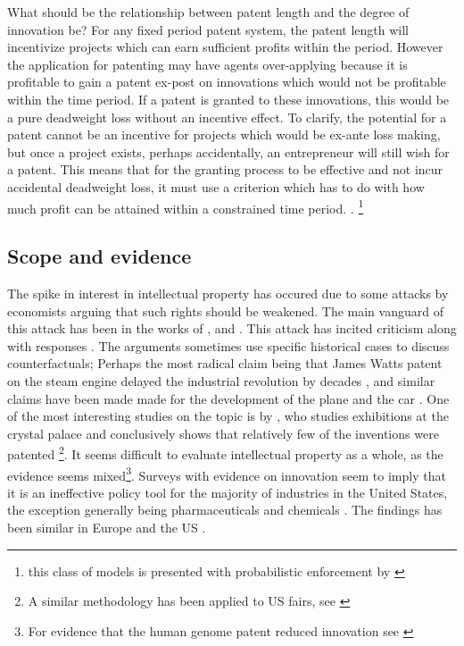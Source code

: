 \documentclass[12pt]{report}
\numberwithin{equation}{section}
\begin{document}
What should be the relationship between patent length and the degree of innovation be? For any fixed period patent system, the patent length will incentivize projects which can earn sufficient profits within the period. However the application for patenting may have agents over-applying because it is profitable to gain a patent ex-post on innovations which would not be profitable within the time period. If a patent is granted to these innovations, this would be a pure deadweight loss without an incentive effect. To clarify, the potential for a patent cannot be an incentive for projects which would be ex-ante loss making, but once a project exists, perhaps accidentally, an entrepreneur will still wish for a patent. This means that for the granting process to be effective and not incur accidental deadweight loss, it must use a criterion which has to do with how much profit can be attained within a constrained time period. \cite{ODonoghue1998}. \footnote{this class of models is presented with probabilistic enforcement by \cite{Chou2007} }

\subsection{Scope and evidence}

The spike in interest in intellectual property has occured due to some attacks by economists arguing that such rights should be weakened. The main vanguard of this attack has been in the works of \cite{dosi2006much}, \cite{boldrinlevine} and  \cite{bessen2008patent}. This attack has incited criticism \citep{scherer2009michele} along with responses \citep{boldrin2013s}. The arguments sometimes use specific historical cases to discuss counterfactuals; Perhaps the most radical claim being that James Watts patent on the steam engine delayed the industrial revolution by decades \citep{boldrinlevine} \citep{nuvolari2004collective}, and similar claims have been made made for the development of the plane and the car \citep{merges1994limiting}. One of the most interesting studies on the topic is by \cite{moser2005patent}, who studies exhibitions at the crystal palace and conclusively shows that relatively few of the inventions were patented \citep{moser2005patent}\footnote{A similar methodology has been applied to US fairs, see \cite{khan2013going}}. It seems difficult to evaluate intellectual property as a whole, as the evidence seems mixed\footnote{For evidence that the human genome patent reduced innovation see \cite{williams2013intellectual}}. Surveys with evidence on innovation seem to imply that it is an ineffective policy tool for the majority of industries in the United States, the exception generally being pharmaceuticals and chemicals \citep{mansfield1986patents} \citep{levin1987appropriating}. The findings has been similar in Europe \citep{arundel1998percentage} and the US \citep{cohen2000protecting}. 
\end{document}
